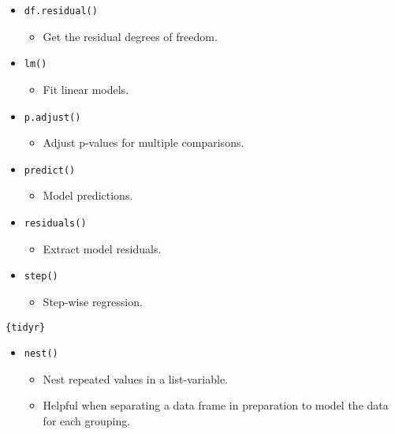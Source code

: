 \documentclass[
]{book}
\providecommand{\tightlist}{%
  \setlength{\itemsep}{0pt}\setlength{\parskip}{0pt}}
\begin{document}
\begin{itemize}
\tightlist
\item
  \texttt{df.residual()}

  \begin{itemize}
  \tightlist
  \item
    Get the residual degrees of freedom.
  \end{itemize}
\item
  \texttt{lm()}

  \begin{itemize}
  \tightlist
  \item
    Fit linear models.
  \end{itemize}
\item
  \texttt{p.adjust()}

  \begin{itemize}
  \tightlist
  \item
    Adjust p-values for multiple comparisons.
  \end{itemize}
\item
  \texttt{predict()}

  \begin{itemize}
  \tightlist
  \item
    Model predictions.
  \end{itemize}
\item
  \texttt{residuals()}

  \begin{itemize}
  \tightlist
  \item
    Extract model residuals.
  \end{itemize}
\item
  \texttt{step()}

  \begin{itemize}
  \tightlist
  \item
    Step-wise regression.
  \end{itemize}
\end{itemize}

\texttt{\{tidyr\}}

\begin{itemize}
\tightlist
\item
  \texttt{nest()}

  \begin{itemize}
  \tightlist
  \item
    Nest repeated values in a list-variable.
  \item
    Helpful when separating a data frame in preparation to model the data for each grouping.
  \end{itemize}
\end{itemize}
\end{document}
